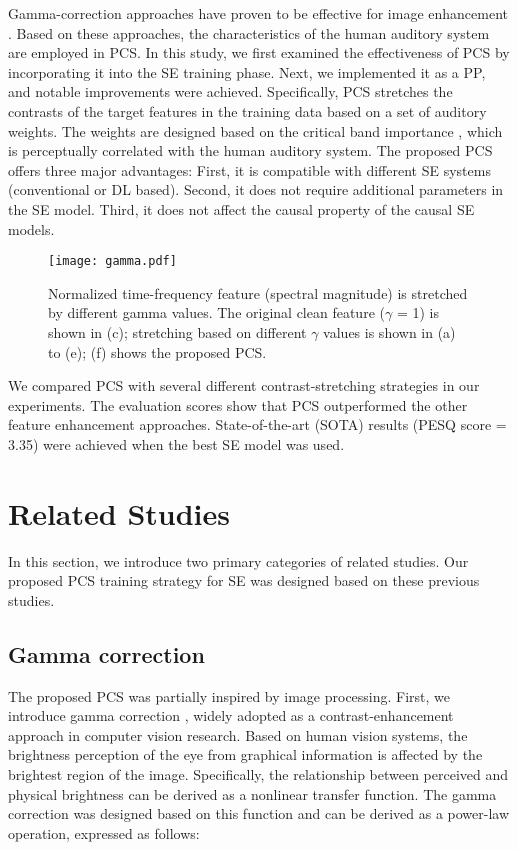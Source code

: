\documentclass[a4paper]{article}
\begin{document}
Gamma-correction approaches have proven to be effective for image enhancement \cite{rahman2016adaptive}. Based on these approaches, the characteristics of the human auditory system are employed in PCS. In this study, we first examined the effectiveness of PCS by incorporating it into the SE training phase. Next, we implemented it as a PP, and notable improvements were achieved. Specifically, PCS stretches the contrasts of the target features in the training data based on a set of auditory weights. The weights are designed based on the critical band importance \cite{pavlovic2018sii}, which is perceptually correlated with the human auditory system. The proposed PCS offers three major advantages: First, it is compatible with different SE systems (conventional or DL based). Second, it does not require additional parameters in the SE model. Third, it does not affect the causal property of the causal SE models.
\begin{figure*}
 \centering
 \texttt{[image: gamma.pdf]}
 \caption{Normalized time-frequency feature (spectral magnitude) is stretched by different gamma values. The original clean feature ($\gamma$ = 1) is shown in (c); stretching based on different $\gamma$ values is shown in (a) to (e); (f) shows the proposed PCS.} 
 \label{fig:gammagraph}
\end{figure*}
We compared PCS with several different contrast-stretching strategies in our experiments. The evaluation scores show that PCS outperformed the other feature enhancement approaches. State-of-the-art (SOTA) results (PESQ score = 3.35) were achieved when the best SE model was used.




\section{Related Studies}
In this section, we introduce two primary categories of related studies. Our proposed PCS training strategy for SE was designed based on these previous studies. 

\subsection{Gamma correction}
\label{ssec:gammacorrection}

The proposed PCS was partially inspired by image processing. First, we introduce gamma correction \cite{poynton2012digital}, widely adopted as a contrast-enhancement approach in computer vision research. Based on human vision systems, the brightness perception of the eye from graphical information is affected by the brightest region of the image. Specifically, the relationship between perceived and physical brightness can be derived as a nonlinear transfer function. The gamma correction was designed based on this function and can be derived as a power-law operation, expressed as follows:
\end{document}
